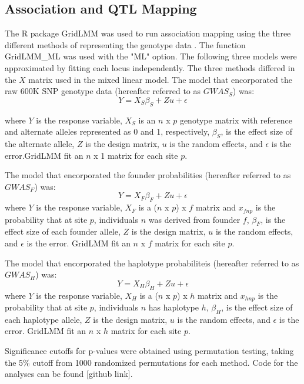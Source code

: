 \documentclass[article,9pt,twocolumn,twoside]{rilabRxiv}
\begin{document}
\subsection{Association and QTL Mapping}
The R package GridLMM was used to run association mapping using the three different methods of representing the genotype data \citep{RN14}. The function GridLMM\_ML was used with the "ML" option.  The following three models were approximated by fitting each locus independently. The three methods differed in the $X$ matrix used in the mixed linear model. The model that encorporated the raw 600K SNP genotype data (hereafter referred to as $GWAS_S$) was:
\begin{equation}
\label{eqn:gridlmm1}
 Y = X_S{\beta_S} + Zu + \epsilon
\end{equation}

where $Y$ is the response variable, $X_S$ is an $n$ x $p$ genotype matrix with reference and alternate alleles represented as 0 and 1, respectively, $\beta_S$, is the effect size of the alternate allele, $Z$ is the design matrix, $u$ is the random effects, and $\epsilon$ is the error.GridLMM fit an $n$ x 1 matrix for each site $p$.

The model that encorporated the founder probabilities (hereafter referred to as $GWAS_F$) was:
\begin{equation}
\label{eqn:gridlmm2}
 Y = X_F{\beta_F} + Zu + \epsilon
\end{equation}
where $Y$ is the response variable, $X_F$ is a ($n$ x $p$) x $f$ matrix and $x_{fnp}$ is the probability that at site $p$, individuals $n$ was derived from founder $f$, $\beta_F$, is the effect size of each founder allele, $Z$ is the design matrix, $u$ is the random effects, and $\epsilon$ is the error. GridLMM fit an $n$ x $f$ matrix for each site $p$.

The model that encorporated the haplotype probabiliteis (hereafter referred to as $GWAS_H$) was:
\begin{equation}
\label{eqn:gridlmm3}
 Y = X_H{\beta_H} + Zu + \epsilon
\end{equation}
where $Y$ is the response variable, $X_H$ is a ($n$ x $p$) x $h$ matrix and $x_{hnp}$ is the probability that at site $p$, individuals $n$ has haplotype $h$, $\beta_H$, is the effect size of each haplotype allele, $Z$ is the design matrix, $u$ is the random effects, and $\epsilon$ is the error. GridLMM fit an $n$ x $h$ matrix for each site $p$.

 Significance cutoffs for p-values were obtained using permutation testing, taking the 5\% cutoff from 1000 randomized permutations for each method. Code for the analyses can be found [github link].
\end{document}
